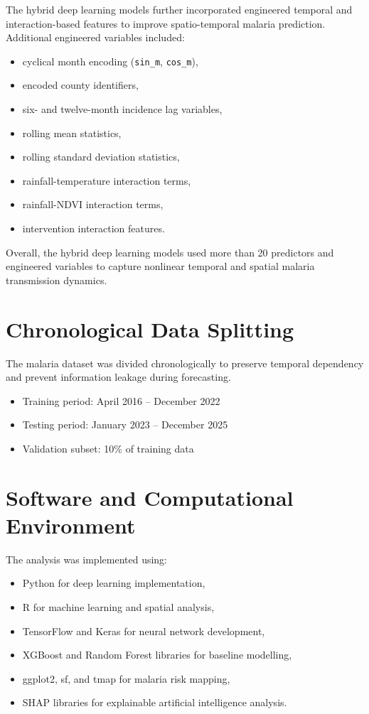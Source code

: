 The hybrid deep learning models further incorporated engineered temporal and interaction-based features to improve spatio-temporal malaria prediction. Additional engineered variables included:
\begin{itemize}
	\item cyclical month encoding (\texttt{sin\_m}, \texttt{cos\_m}),
	\item encoded county identifiers,
	\item six- and twelve-month incidence lag variables,
	\item rolling mean statistics,
	\item rolling standard deviation statistics,
	\item rainfall-temperature interaction terms,
	\item rainfall-NDVI interaction terms,
	\item intervention interaction features.
\end{itemize}

Overall, the hybrid deep learning models used more than 20 predictors and engineered variables to capture nonlinear temporal and spatial malaria transmission dynamics.

\section{Chronological Data Splitting}

The malaria dataset was divided chronologically to preserve temporal dependency and prevent information leakage during forecasting.

\begin{itemize}
	\item Training period: April 2016 -- December 2022
	\item Testing period: January 2023 -- December 2025
	\item Validation subset: 10\% of training data
\end{itemize}

\section{Software and Computational Environment}

The analysis was implemented using:
\begin{itemize}
	\item Python for deep learning implementation,
	\item R for machine learning and spatial analysis,
	\item TensorFlow and Keras for neural network development,
	\item XGBoost and Random Forest libraries for baseline modelling,
	\item ggplot2, sf, and tmap for malaria risk mapping,
	\item SHAP libraries for explainable artificial intelligence analysis.
\end{itemize}
